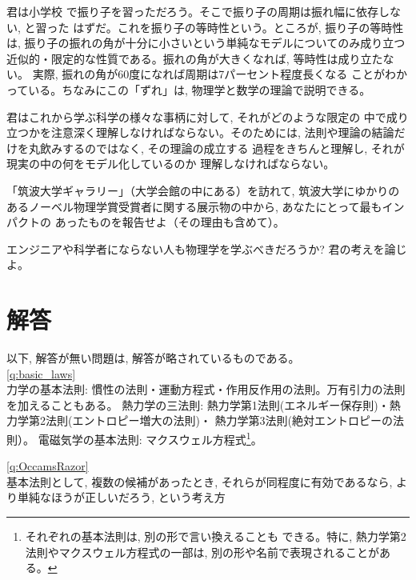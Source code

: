 \begin{exmpl} 君は小学校
で振り子を習っただろう。そこで振り子の周期は振れ幅に依存しない, と習った
はずだ。これを振り子の等時性という。ところが, 
振り子の等時性は, 振り子の振れの角が十分に小さいという単純なモデルについてのみ成り立つ
近似的・限定的な性質である。振れの角が大きくなれば, 等時性は成り立たない。
実際, 振れの角が60度になれば周期は7パーセント程度長くなる
ことがわかっている。ちなみにこの「ずれ」は, 物理学と数学の理論で説明できる。
\end{exmpl}

君はこれから学ぶ科学の様々な事柄に対して, それがどのような限定の
中で成り立つかを注意深く理解しなければならない。そのためには, 
法則や理論の結論だけを丸飲みするのではなく, その理論の成立する
過程をきちんと理解し, それが現実の中の何をモデル化しているのか
理解しなければならない。
\hv



\begin{exq} 「筑波大学ギャラリー」（大学会館の中にある）を訪れて, 筑波大学にゆかりの
あるノーベル物理学賞受賞者に関する展示物の中から, あなたにとって最もインパクトの
あったものを報告せよ（その理由も含めて）。\end{exq}

\begin{exq} エンジニアや科学者にならない人も物理学を学ぶべきだろうか? 
君の考えを論じよ。\end{exq}


\section*{解答}

以下, 解答が無い問題は, 解答が略されているものである。\\

\ref{q:basic_laws}\\
力学の基本法則: 慣性の法則・運動方程式・作用反作用の法則。万有引力の法則を加えることもある。
熱力学の三法則: 熱力学第1法則(エネルギー保存則)・熱力学第2法則(エントロピー増大の法則)・
熱力学第3法則(絶対エントロピーの法則）。
電磁気学の基本法則: マクスウェル方程式\footnote{それぞれの基本法則は, 別の形で言い換えることも
できる。特に, 熱力学第2法則やマクスウェル方程式の一部は, 別の形や名前で表現されることがある。}。
\vspace{0.2cm}


\ref{q:OccamsRazor}\\
基本法則として, 複数の候補があったとき, それらが同程度に有効であるなら, 
より単純なほうが正しいだろう, という考え方
\vspace{0.2cm}

